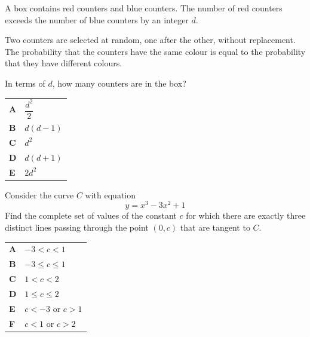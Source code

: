 \documentclass[11pt,a4paper]{article}
\begin{document}
\clearpage
\thispagestyle{djspaper}
\vspace*{8pt}
\begin{enumerate}[label=\textbf{\arabic*.},leftmargin=*,itemsep=0pt,start=15]
A box contains red counters and blue counters. The number of red counters exceeds the number of blue counters by an integer $d$.

Two counters are selected at random, one after the other, without replacement. The probability that the counters have the same colour is equal to the probability that they have different colours.

In terms of $d$, how many counters are in the box?

\par\vspace*{12pt}
\begin{tabularx}{\linewidth}{@{}>{\bfseries}l Y@{}}
A &
$\dfrac{d^2}{2}$
\\[0.8em]
B &
$d(d-1)$
\\[0.8em]
C &
$d^2$
\\[0.8em]
D &
$d(d+1)$
\\[0.8em]
E &
$2d^2$
\\
\end{tabularx}
\end{enumerate}
\clearpage
\thispagestyle{djspaper}
\vspace*{8pt}
\begin{enumerate}[label=\textbf{\arabic*.},leftmargin=*,itemsep=0pt,start=16]
\questionitem[Polynomials]
Consider the curve $C$ with equation \[y = x^3 - 3x^2 + 1\]
Find the complete set of values of the constant $c$ for which there are exactly three distinct lines passing through the point $(0, c)$ that are tangent to $C$.

\par\vspace*{12pt}
\begin{tabularx}{\linewidth}{@{}>{\bfseries}l Y@{}}
A &
$-3 < c < 1$
\\[0.8em]
B &
$-3 \le c \le 1$
\\[0.8em]
C &
$1 < c < 2$
\\[0.8em]
D &
$1 \le c \le 2$
\\[0.8em]
E &
$c < -3$ or $c > 1$
\\[0.8em]
F &
$c < 1$ or $c > 2$
\\
\end{tabularx}
\end{enumerate}
\end{document}
